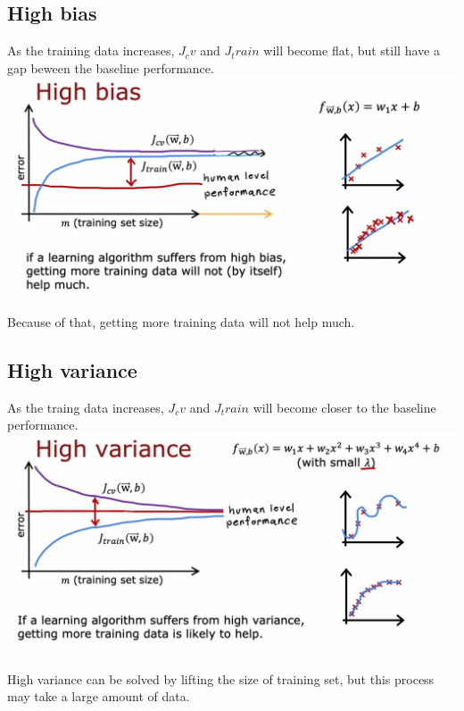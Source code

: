 \subsection*{High bias}
As the training data increases, $J_cv$ and $J_train$ will become flat, but still have a gap beween the
baseline performance.\\
\includegraphics*[width=\textwidth]{images/10.14}
\par
Because of that, getting more training data will not help much.
\subsection*{High variance}
As the traing data increases, $J_cv$ and $J_train$ will become closer to the baseline performance.\\
\includegraphics*[width=\textwidth]{images/10.15}
\par
High variance can be solved by lifting the size of training set, 
but this process may take a large amount of data.
